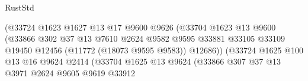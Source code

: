 \begin{lexlean}{RustStd}
\begin{coremodule}
                                              (@33724
                                                @1623
                                                @1627
                                                @13
                                                @17
                                                @9600
                                                @9626
                                                (@33704
                                                  @1623
                                                  @13
                                                  @9600
                                                  (@33866
                                                    @302
                                                    @37
                                                    @13
                                                    @7610
                                                    @2624
                                                    @9582
                                                    @9595
                                                    @33881
                                                    @33105
                                                    @33109
                                                    @19450
                                                    @12456
                                                    (@11772 (@18073 @9595 @9583))
                                                    @12686))
                                                (@33724
                                                  @1625
                                                  @100
                                                  @13
                                                  @16
                                                  @9624
                                                  @2414
                                                  (@33704
                                                    @1625
                                                    @13
                                                    @9624
                                                    (@33866
                                                      @307
                                                      @37
                                                      @13
                                                      @3971
                                                      @2624
                                                      @9605
                                                      @9619
                                                      @33912

\end{coremodule}
\end{lexlean}

